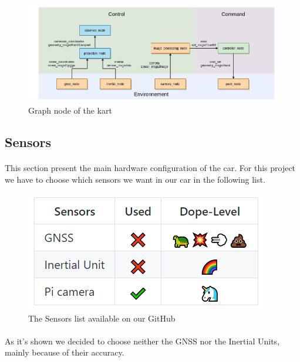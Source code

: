 \begin{figure}[!ht]
    \begin{center}
        \includegraphics[scale=0.3]{Images/node_graph.png}
    \end{center}
    \caption{Graph node of the kart}
    \label{fig:graphnode}
\end{figure}

\subsection{Sensors}

\paragraph{}This section present the main hardware configuration of the car. 
For this project we have to choose which sensors we want in our 
car in the following list.

\begin{figure}[!ht]
    \begin{center}
        \includegraphics[scale=0.6]{Images/Sensors.png}
    \end{center}
    \caption{The Sensors list available on our GitHub}
    \label{fig:sensors}
\end{figure}

\paragraph{}
As it's shown we decided to choose neither the GNSS nor the Inertial 
Units, mainly because of their accuracy.

